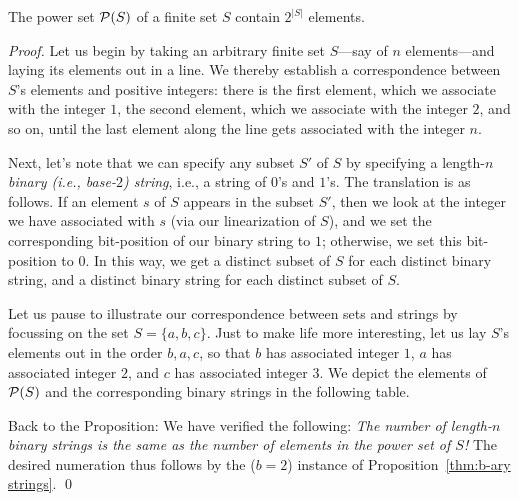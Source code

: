 \medskip


\begin{prop}
\label{thm:power-sets}
The power set $\mbox{$\cal P$}(S)$ of a finite set $S$ contain $2^{|S|}$ elements.
\end{prop}

\begin{proof}
Let us begin by taking an arbitrary finite set $S$---say of $n$
elements---and laying its elements out in a line.  We thereby
establish a correspondence between $S$'s elements and positive
integers: there is the first element, which we associate with the
integer $1$, the second element, which we associate with the integer
$2$, and so on, until the last element along the line gets associated
with the integer $n$.

Next, let's note that we can specify any subset $S'$ of $S$ by
specifying a length-$n$ {\em binary (i.e., base-$2$) string}, i.e., a
string of $0$'s and $1$'s.  The translation is as follows.  If an
element $s$ of $S$ appears in the subset $S'$, then we look at the
integer we have associated with $s$ (via our linearization of $S$),
and we set the corresponding bit-position of our binary string to $1$;
otherwise, we set this bit-position to $0$.  In this way, we get a
distinct subset of $S$ for each distinct binary string, and a distinct
binary string for each distinct subset of $S$.

Let us pause to illustrate our correspondence between sets and strings
by focussing on the set $S = \{a,b,c\}$.  Just to make life more
interesting, let us lay $S$'s elements out in the order $b,a,c$, so
that $b$ has associated integer $1$, $a$ has associated integer $2$,
and $c$ has associated integer $3$.  We depict the elements of $\mbox{$\cal P$}(S)$
and the corresponding binary strings in the following table.
\begin{center}
\end{center}

Back to the Proposition: We have verified the following: {\em The
  number of length-$n$ binary strings is the same as the number of
  elements in the power set of $S$!}  The desired numeration thus
follows by the ($b=2$) instance of Proposition~\ref{thm:b-ary
  strings}.  \qed
\end{proof}


